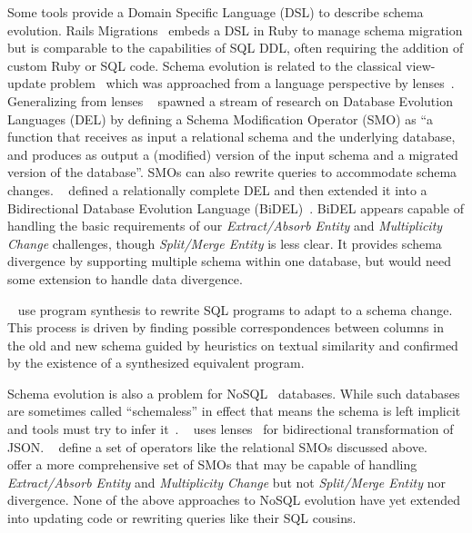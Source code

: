 \documentclass[english,crc]{programming}
\newcommand{\citet}[1]{\citeauthor*{#1}~\cite{#1}}
\begin{document}
Some tools provide a Domain Specific Language (DSL) to describe schema evolution. Rails Migrations~\cite{RailsMigrations} embeds a DSL in Ruby to manage schema migration but is comparable to the capabilities of SQL DDL, often requiring the addition of custom Ruby or SQL code. Schema evolution is related to the classical view-update problem~\cite{Bancilhon81} which was approached from a language perspective by lenses~\cite{Foster2007}. Generalizing from lenses \citet{curino08} spawned a stream of research on Database Evolution Languages (DEL) by defining a Schema Modification Operator (SMO) as ``a function that receives as input a relational schema and the underlying database, and produces as output a (modified) version of the input schema and a migrated version of the database''. SMOs can also rewrite queries to accommodate schema changes. \citet{herrmann15} defined a relationally complete DEL and then extended it into a Bidirectional Database Evolution Language (BiDEL)~\cite{herrmann17}. BiDEL appears capable of handling the basic requirements of our \emph{Extract/Absorb Entity} and \emph{Multiplicity Change} challenges, though \emph{Split/Merge Entity} is less clear. It provides schema divergence by supporting multiple schema within one database, but would need some extension to handle data divergence.

\citet{wang19} use program synthesis to rewrite SQL programs to adapt to a schema change. This process is driven by finding possible correspondences between columns in the old and new schema guided by heuristics on textual similarity and confirmed by the existence of a synthesized equivalent program.

Schema evolution is also a problem for NoSQL~\cite{sadalage12} databases. While such databases are sometimes called ``schemaless'' in effect that means the schema is left implicit and tools must try to infer it~\cite{storl20, storl22}. \citet{Cambria} uses lenses~\cite{Foster2007} for bidirectional transformation of JSON. \citet{scherzinger13} define a set of operators like the relational SMOs discussed above. \citeauthor*{chillon21}~\cite{chillon21, chillon22} offer a more comprehensive set of SMOs that may be capable of handling \textit{Extract/Absorb Entity} and \emph{Multiplicity Change} but not \emph{Split/Merge Entity} nor divergence. None of the above approaches to NoSQL evolution have yet extended into updating code or rewriting queries like their SQL cousins.
\end{document}
